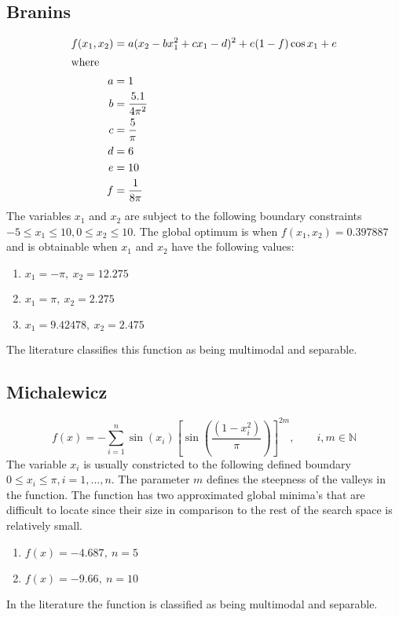 \subsection{Branins}
\begin{align}
	f(x_1,x_2) &= a(x_2 - bx_1^2 + cx_1 - d)^2 + e(1-f)\cos{x_1} + e \\
\intertext{where}
	a &= 1\nonumber\\
	b &= \frac{5.1}{4\pi^2}\nonumber\\
	c &= \frac{5}{\pi}\nonumber\\
	d &= 6\nonumber\\
	e &= 10\nonumber\\
	f &= \frac{1}{8\pi}\nonumber
\end{align}
The variables $x_1$ and $x_2$ are subject to the following boundary constraints $-5\leq x_1 \leq 10, 0 \leq x_2 \leq 10$\cite{ABCCompareStudy,TSGlobalOptimization,ContinACSTS,TestFunctions}. The global optimum is when $f(x_1,x_2) = 0.397887$ and is obtainable when $x_1$ and $x_2$ have the following values\cite{ABCCompareStudy,TSGlobalOptimization,ContinACSTS,TestFunctions}:
\begin{enumerate}
\item $x_1 = -\pi,\:x_2=12.275$
\item $x_1 = \pi,\:x_2=2.275$
\item $x_1 = 9.42478,\:x_2=2.475$
\end{enumerate}
The literature classifies this function as being multimodal and separable\cite{ABCCompareStudy,TSGlobalOptimization,ContinACSTS,TestFunctions}.
\subsection{Michalewicz}
\begin{equation}
	f(x) = -\sum_{i=1}^n\sin{(x_i)}[\sin{(\frac{(1 - x_i^2)}{\pi})}]^{2m}, \qquad i,m \in \mathbb{N}
\end{equation}
The variable $x_i$ is usually constricted to the following defined boundary $0 \leq x_i \leq \pi, i = 1,\ldots,n$\cite{ABCCompareStudy,TestFunctions}. The parameter $m$ defines the steepness of the valleys in the function. The function has two approximated global minima's that are difficult to locate since their size in comparison to the rest of the search space is relatively small\cite{ABCCompareStudy,TestFunctions}.
\begin{enumerate}
\item $f(x) = -4.687,\: n = 5$
\item $f(x) = -9.66,\: n = 10$
\end{enumerate}
In the literature the function is classified as being multimodal and separable\cite{ABCCompareStudy}.
